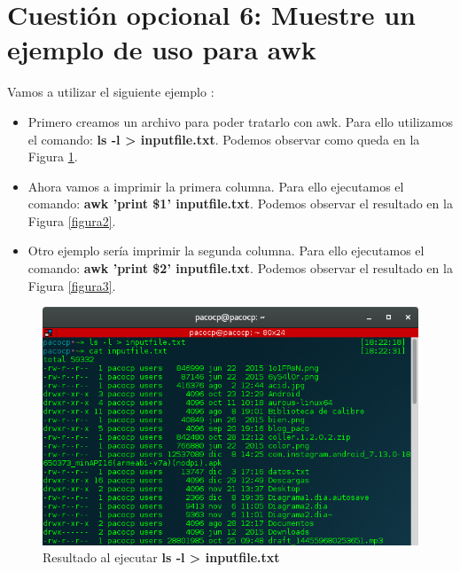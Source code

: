 
\section{Cuestión opcional 6: Muestre un ejemplo de uso para awk}

Vamos a utilizar el siguiente ejemplo \cite{awk}:

\begin{itemize}
	\item Primero creamos un archivo para poder tratarlo con awk. Para ello utilizamos el comando: \textbf{ls -l > inputfile.txt}. Podemos observar como queda en la Figura \ref{figura1}.
	\item Ahora vamos a imprimir la primera columna. Para ello ejecutamos el comando: \textbf{awk '{print \$1}' inputfile.txt}. Podemos observar el resultado en la Figura \ref{figura2}.
	\item Otro ejemplo sería imprimir la segunda columna. Para ello ejecutamos el comando: \textbf{awk '{print \$2}' inputfile.txt}. Podemos observar el resultado en la Figura \ref{figura3}.
\end{itemize}

\begin{figure}[H] %
	\centering
	\includegraphics[scale=0.5]{figuras/figura1.png}  %

	
	\caption{Resultado al ejecutar \textbf{ls -l > inputfile.txt}}
	\label{figura1}
\end{figure}

